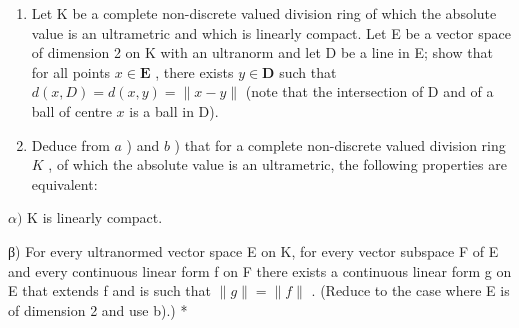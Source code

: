 \begin{enumerate}
\def\labelenumi{\alph{enumi})}
\setcounter{enumi}{1}
\item
  Let K be a complete non-discrete valued division ring of which the absolute value is an ultrametric and which is linearly compact. Let E be a vector space of dimension 2 on K with an ultranorm and let D be a line in E; show that for all points \(x \in \mathbf{E}\) , there exists \(y \in \mathbf{D}\) such that \(d(x, D) = d(x, y) = \| x - y \|\) (note that the intersection of D and of a ball of centre \(x\) is a ball in D).
\item
  Deduce from \(a\) ) and \(b\) ) that for a complete non-discrete valued division ring \(K\) , of which the absolute value is an ultrametric, the following properties are equivalent:
\end{enumerate}

\(\alpha)\) K is linearly compact.

β) For every ultranormed vector space E on K, for every vector subspace F of E and every continuous linear form f on F there exists a continuous linear form g on E that extends f and is such that \(\|g\| = \|f\|\) . (Reduce to the case where E is of dimension 2 and use b).) *

